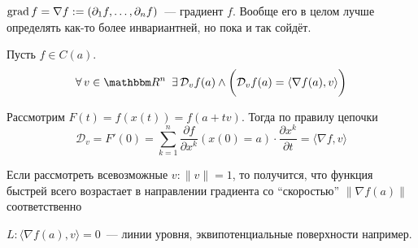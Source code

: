\documentclass[12pt]{../../notes}
\begin{document}
\begin{defn}\label{defn:gradRn}
  $\operatorname{\mathrm{grad}} f = \nabla f := (\partial_1 f, \dotsc, \partial_n f)$~--- градиент $f$. Вообще его в целом 
  лучше определять как-то более инвариантней, но пока и так сойдёт.
\end{defn}

\begin{thrm}\label{thrm:gradvecderRn}
  Пусть $f\in C(a)$. 
  \[
    \forall\, v\in \R^n \;\: \exists\, \mathcal{D}_v f(a) 
    \wedge \bigg( \mathcal{D}_v f(a) = \langle \nabla f(a) , v \rangle \bigg)
  \]
\end{thrm}
\begin{ittproof}
  Рассмотрим $F(t) = f(x(t)) = f(a + t v)$. Тогда по правилу цепочки
  \[
    \mathcal{D}_v = F'(0) = \sum_{k=1}^n \frac{\partial f}{\partial x^k}(x(0) = a)\cdot \frac{\partial x^k}{\partial t} 
    = \langle \nabla f, v\rangle
  \]
\end{ittproof}

\begin{rem}
  Если рассмотреть всевозможные $v:\|v\|=1$, то получится, что функция быстрей всего возрастает в 
  направлении градиента со ``скоростью'' $\|\nabla f(a)\|$ соответственно
\end{rem}

\begin{rem}
  $L:\langle \nabla f(a), v\rangle = 0$~--- линии уровня, эквипотенциальные поверхности например.
\end{rem}
\end{document}
